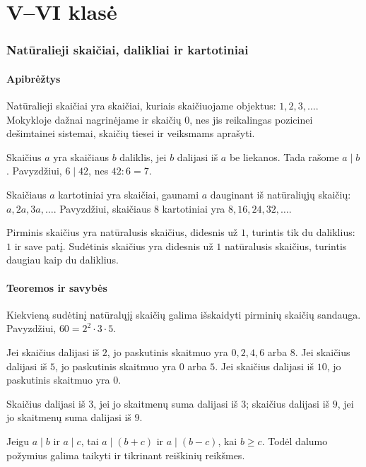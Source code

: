 \part{V--VI klasė}

\section{Natūralieji skaičiai, dalikliai ir kartotiniai}\label{sec:naturalieji-skaiciai-dalikliai-ir-kartotiniai}

\subsection{Apibrėžtys}
\begin{apibreztis}
Natūralieji skaičiai yra skaičiai, kuriais skaičiuojame objektus: \(1,2,3,\ldots\). Mokykloje dažnai nagrinėjame ir skaičių \(0\), nes jis reikalingas pozicinei dešimtainei sistemai, skaičių tiesei ir veiksmams aprašyti.
\end{apibreztis}
\begin{apibreztis}
Skaičius \(a\) yra skaičiaus \(b\) daliklis, jei \(b\) dalijasi iš \(a\) be liekanos. Tada rašome \(a\mid b\). Pavyzdžiui, \(6\mid 42\), nes \(42:6=7\).
\end{apibreztis}
\begin{apibreztis}
Skaičiaus \(a\) kartotiniai yra skaičiai, gaunami \(a\) dauginant iš natūraliųjų skaičių: \(a,2a,3a,\ldots\). Pavyzdžiui, skaičiaus \(8\) kartotiniai yra \(8,16,24,32,\ldots\).
\end{apibreztis}
\begin{apibreztis}
Pirminis skaičius yra natūralusis skaičius, didesnis už \(1\), turintis tik du daliklius: \(1\) ir save patį. Sudėtinis skaičius yra didesnis už \(1\) natūralusis skaičius, turintis daugiau kaip du daliklius.
\end{apibreztis}

\subsection{Teoremos ir savybės}
\begin{savybe}
Kiekvieną sudėtinį natūralųjį skaičių galima išskaidyti pirminių skaičių sandauga. Pavyzdžiui, \(60=2^2\cdot 3\cdot 5\).
\end{savybe}
\begin{savybe}
Jei skaičius dalijasi iš \(2\), jo paskutinis skaitmuo yra \(0,2,4,6\) arba \(8\). Jei skaičius dalijasi iš \(5\), jo paskutinis skaitmuo yra \(0\) arba \(5\). Jei skaičius dalijasi iš \(10\), jo paskutinis skaitmuo yra \(0\).
\end{savybe}
\begin{savybe}
Skaičius dalijasi iš \(3\), jei jo skaitmenų suma dalijasi iš \(3\); skaičius dalijasi iš \(9\), jei jo skaitmenų suma dalijasi iš \(9\).
\end{savybe}
\begin{savybe}
Jeigu \(a\mid b\) ir \(a\mid c\), tai \(a\mid (b+c)\) ir \(a\mid (b-c)\), kai \(b\ge c\). Todėl dalumo požymius galima taikyti ir tikrinant reiškinių reikšmes.
\end{savybe}

